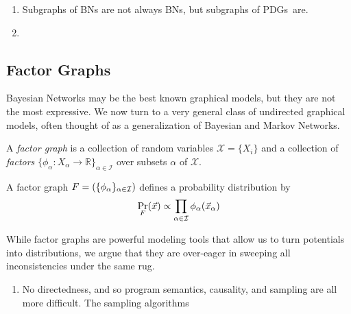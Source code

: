 \documentclass{article}
\newcommand{\MN}{PDG}
\newcommand{\MNs}{\MN s}
\begin{document}
	\begin{fact}
		\begin{enumerate}
			\item Subgraphs of BNs are not always BNs, but subgraphs of \MNs\ are.
			\item 
		\end{enumerate}
	\end{fact}
	
	\subsection{Factor Graphs} \label{sec:factor-graphs}
	
	Bayesian Networks may be the best known graphical models, but they are not the most expressive. We now turn to a very general class of undirected graphical models, often thought of as a generalization of Bayesian and Markov Networks.
	\begin{defn}
		A \emph{factor graph} is a collection of random variables $\mathcal X = \{X_i\}$ and a collection of \emph{factors} $\{\phi_\alpha\colon X_\alpha \to \mathbb R\}_{\alpha \in \mathcal I }$ over subsets $\alpha$ of $\mathcal X$.
	\end{defn}

	A factor graph $F = (\{\phi_\alpha\}_{\alpha \in \cal I})$ defines a probability distribution by 
	\[ \Pr_F(\vec x) \propto \prod_{\alpha \in \cal I} \phi_\alpha(\vec x_{\alpha}) \]

	While factor graphs are powerful modeling tools that allow us to turn potentials into distributions, we argue that they are over-eager in sweeping all inconsistencies under the same rug. 
	\begin{enumerate}
		\item No directedness, and so program semantics, causality, and sampling are all more difficult. The sampling algorithms
	\end{enumerate}
	
\end{document}
